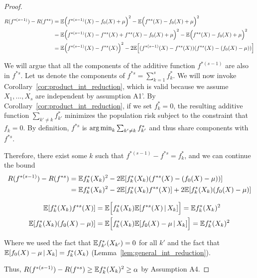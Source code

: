 \begin{proof}

\begin{align*}
R(f^{*(s-1)}) - R(f^{*s}) &= {\mathbb E}\Big(f^{*(s-1)}(X) - f_0(X) + \mu\Big)^2 
                              - {\mathbb E}\Big(f^{*s}(X) - f_0(X) + \mu\Big)^2 \\
    &= {\mathbb E}\Big( f^{*(s-1)}(X) - f^{*s}(X) + f^{*s}(X) - f_0(X) + \mu\Big)^2 
                                 - {\mathbb E}\Big(f^{*s}(X) - f_0(X) + \mu\Big)^2 \\
    &= {\mathbb E}\Big( f^{*(s-1)}(X) - f^{*s}(X)\Big)^2 
                - 2 {\mathbb E}\Big[ (f^{*(s-1)}(X) - f^{*s}(X)) (f^{*s}(X) - (f_0(X)-\mu)) \Big]
\end{align*}

We will argue that all the components of the additive function $f^{*(s-1)}$ are also in $f^{*s}$. Let us denote the components of $f^{*s} = \sum_{k=1}^s f_k^*$. We will now invoke Corollary~\ref{cor:product_int_reduction}, which is valid because we assume $X_1,...,X_s$ are independent by assumption A1'. By Corollary~\ref{cor:product_int_reduction}, if we set $f^*_k = 0$, the resulting additive function $\sum_{k'\neq k} f_{k'}^*$ minimizes the population risk subject to the constraint that $f_k = 0$. By definition, $f^{*s}$ is $\mathop{\text{\rm arg\,min}}_k \sum_{k'\neq k} f_{k'}^*$ and thus share components with $f^{*s}$.

Therefore, there exist some $k$ such that $f^{*(s-1)} - f^{*s} = f^*_k$, and we can continue the bound
\begin{align*}
R(f^{*(s-1)}) - R(f^{*s}) &= {\mathbb E} f^*_k(X_k)^2 - 2 {\mathbb E}[ f^*_k(X_k) ( f^{*s}(X) - (f_0(X)-\mu) )] \\
    &= {\mathbb E} f^*_k(X_k)^2 - 2 {\mathbb E}[ f^*_k(X_k) f^{*s} (X)] + 2 {\mathbb E}[ f^*_k(X_k) (f_0(X)-\mu) ] 
\end{align*}

\begin{align*}
{\mathbb E}[ f^*_k(X_k) f^{*s} (X)]  &= {\mathbb E}\Big[ f^*_k (X_k) {\mathbb E}[ f^{*s} (X) \,|\, X_k ] \Big] = {\mathbb E} f^*_k(X_k)^2  \\
{\mathbb E}[ f^*_k(X_k)(f_0(X) - \mu) ] &= {\mathbb E}\Big[ f^*_k(X_k) {\mathbb E}[ f_0(X) - \mu \,|\, X_k ] \Big] = {\mathbb E} f^*_k(X_k)^2 
\end{align*}

Where we used the fact that ${\mathbb E} f^*_{k'} (X_{k'}) = 0$ for all $k'$ and the fact that ${\mathbb E}[ f_0(X) - \mu \,|\, X_k] = f^*_k(X_k)$ (Lemma~\ref{lem:general_int_reduction}).

Thus, $R(f^{*(s-1)}) - R(f^{*s}) \geq {\mathbb E} f^*_k(X_k)^2 \geq \alpha$ by Assumption A4.

\end{proof}


